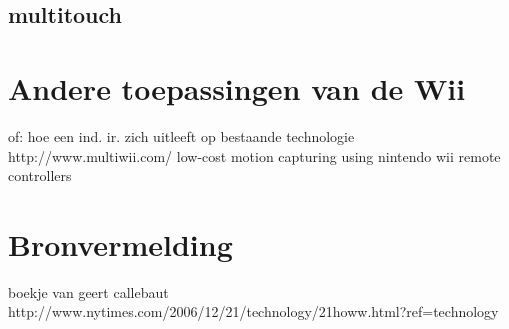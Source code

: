 \documentclass[11pt]{article}
\begin{document}
\subsection{multitouch}



\section{Andere toepassingen van de Wii}
of: hoe een ind. ir. zich uitleeft op bestaande technologie
http://www.multiwii.com/
low-cost motion capturing using nintendo wii remote controllers

\section{Bronvermelding}

boekje van geert callebaut
http://www.nytimes.com/2006/12/21/technology/21howw.html?ref=technology



\end{document}
